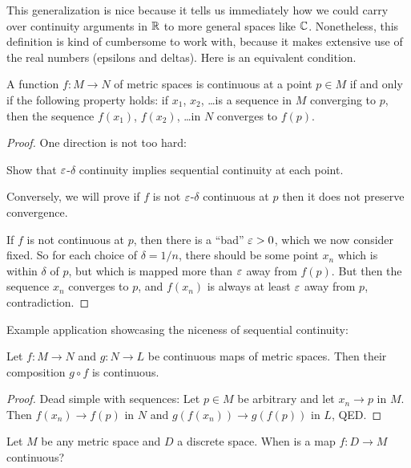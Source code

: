 This generalization is nice because it tells us immediately how we could carry over continuity arguments in $\mathbb R$ to more general spaces like $\mathbb C$.
Nonetheless, this definition is kind of cumbersome to work with,
because it makes extensive use of the real numbers
(epsilons and deltas).
Here is an equivalent condition.
\begin{theorem}
	\label{thm:seq_cont}
	A function $f \colon M \to N$ of metric spaces
	is continuous at a point $p \in M$
	if and only if the following property holds:
	if $x_1$, $x_2$, \dots is a sequence in $M$ converging to $p$,
	then the sequence $f(x_1)$, $f(x_2)$, \dots in $N$ converges to $f(p)$.
\end{theorem}
\begin{proof}
	One direction is not too hard:
	\begin{exercise}
		Show that $\varepsilon$-$\delta$ continuity implies sequential continuity
		at each point.
	\end{exercise}
	Conversely, we will prove if $f$ is not $\varepsilon$-$\delta$ continuous at $p$
	then it does not preserve convergence.

	If $f$ is not continuous at $p$, then there is a ``bad'' $\varepsilon > 0$,
	which we now consider fixed.
	So for each choice of $\delta = 1/n$,
	there should be some point $x_n$ which is within $\delta$ of $p$,
	but which is mapped more than $\varepsilon$ away from $f(p)$.
	But then the sequence $x_n$ converges to $p$,
	and $f(x_n)$ is always at least $\varepsilon$ away from $p$, contradiction.
\end{proof}

Example application showcasing the niceness of sequential continuity:
\begin{proposition}
	Let $f \colon M \to N$ and $g \colon N \to L$ be continuous maps of metric spaces.
	Then their composition $g \circ f$ is continuous.
\end{proposition}
\begin{proof}
	Dead simple with sequences:
	Let $p \in M$ be arbitrary and let $x_n \to p$ in $M$.
	Then $f(x_n) \to f(p)$ in $N$ and $g(f(x_n)) \to g(f(p))$ in $L$, QED.
\end{proof}

\begin{ques}
	Let $M$ be any metric space and $D$ a discrete space.
	When is a map $f \colon D \to M$ continuous?
\end{ques}



